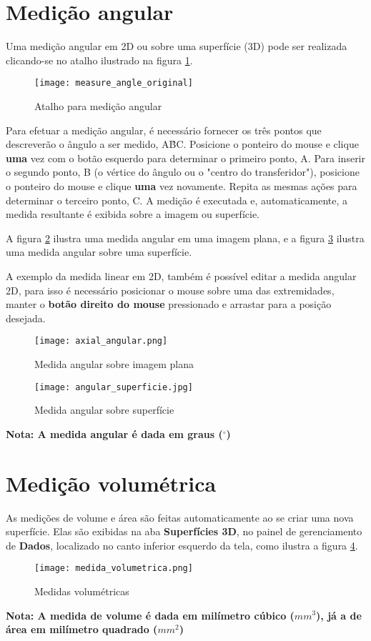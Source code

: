 \section{Medição angular}

Uma medição angular em 2D ou sobre uma superfície (3D) pode ser realizada clicando-se
no atalho ilustrado na figura \ref{fig:atalho_angular}.

\begin{figure}[!htb]
\centering
\texttt{[image: measure\_angle\_original]}
\caption{Atalho para medição angular}
\label{fig:atalho_angular}
\end{figure}

Para efetuar a medição angular, é necessário fornecer os três pontos que descreverão o
ângulo a ser medido, A\^{B}C. Posicione o ponteiro do mouse e clique \textbf{uma} vez
com o botão esquerdo para determinar o primeiro ponto, A. Para inserir o segundo ponto,
B (o vértice do ângulo ou o "centro do transferidor"), posicione o ponteiro do mouse e
clique \textbf{uma} vez novamente. Repita as mesmas ações para determinar o terceiro
ponto, C. A medição é executada e, automaticamente, a medida resultante é exibida sobre
a imagem ou superfície.

A figura \ref{fig:axial_angular} ilustra uma medida angular em uma imagem plana, e a
figura \ref{fig:axial_superficie} ilustra uma medida angular sobre uma superfície.

A exemplo da medida linear em 2D, também é possível editar a medida angular 2D, para isso é necessário posicionar o mouse sobre uma das extremidades, manter o \textbf{botão direito do mouse} pressionado e arrastar para a posição desejada.

\begin{figure}[!htb]
\centering
\texttt{[image: axial\_angular.png]}
\caption{Medida angular sobre imagem plana}
\label{fig:axial_angular}
\end{figure}

\begin{figure}[!htb]
\centering
\texttt{[image: angular\_superficie.jpg]}
\caption{Medida angular sobre superfície}
\label{fig:axial_superficie}
\end{figure}

\textbf{Nota: A medida angular é dada em graus ($^{\circ}$)}


\section{Medição volumétrica}

As medições de volume e área são feitas automaticamente ao se criar uma nova superfície.
Elas são exibidas na aba \textbf{Superfícies 3D}, no painel de gerenciamento de \textbf{Dados}, localizado no canto
inferior esquerdo da tela, como ilustra a figura \ref{fig:volumetric_mensure}.

\begin{figure}[!htb]
\centering
\texttt{[image: medida\_volumetrica.png]}
\caption{Medidas volumétricas}
\label{fig:volumetric_mensure}
\end{figure}

\textbf{Nota: A medida de volume é dada em milímetro cúbico ($mm^3$), já a de área em milímetro quadrado ($mm^2$)}
